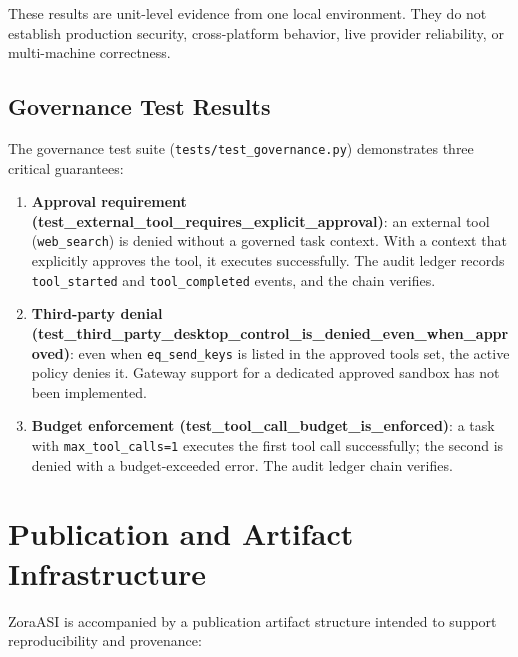 \documentclass[11pt]{article}
\begin{document}
These results are unit-level evidence from one local environment. They do not establish
production security, cross-platform behavior, live provider reliability, or
multi-machine correctness.

\subsection{Governance Test Results}

The governance test suite (\texttt{tests/test\_governance.py}) demonstrates three critical guarantees:

\begin{enumerate}[leftmargin=*]
  \item \textbf{Approval requirement (test\_external\_tool\_requires\_explicit\_approval)}: an external tool (\texttt{web\_search}) is denied without a governed task context. With a context that explicitly approves the tool, it executes successfully. The audit ledger records \texttt{tool\_started} and \texttt{tool\_completed} events, and the chain verifies.
  \item \textbf{Third-party denial (test\_third\_party\_desktop\_control\_is\_denied\_even\_when\_approved)}: even when \texttt{eq\_send\_keys} is listed in the approved tools set, the active policy denies it. Gateway support for a dedicated approved sandbox has not been implemented.
  \item \textbf{Budget enforcement (test\_tool\_call\_budget\_is\_enforced)}: a task with \texttt{max\_tool\_calls=1} executes the first tool call successfully; the second is denied with a budget-exceeded error. The audit ledger chain verifies.
\end{enumerate}

\section{Publication and Artifact Infrastructure}

ZoraASI is accompanied by a publication artifact structure intended to support reproducibility and provenance:
\end{document}
